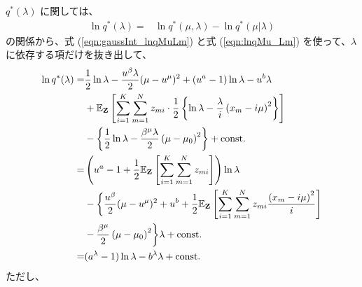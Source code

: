$q^*(\lambda)$ に関しては、
\begin{align}
  \ln q^*(\lambda)  =&  \ln q^*(\mu, \lambda) - \ln q^*(\mu | \lambda)
\end{align}
の関係から、式 (\ref{eqn:gaussInt_lnqMuLm}) と式 (\ref{eqn:lnqMu_Lm}) を使って、$\lambda$ に依存する項だけを抜き出して、
\begin{align}
  \ln q^*(\lambda)  =&  \frac{1}{2} \ln \lambda - \frac{u^\beta \lambda}{2} (\mu - u^\mu)^2 + (u^a - 1) \ln \lambda - u^b \lambda  \notag  \\
  &  + \mathbb{E}_{{\bf Z}}\left[ \sum_{i=1}^K \sum_{m=1}^N z_{mi} \cdot \frac{1}{2} \left\{ \ln \lambda - \frac{\lambda}{i} \left( {x_m} - i \mu \right)^2 \right\} \right]  \notag  \\  
  &  - \left\{  \frac{1}{2} \ln \lambda - \frac{\beta^\mu \lambda}{2} \left( \mu - \mu_{0} \right)^2  \right\}
    + {\rm const.}  \\
%
    =&  \left( u^a - 1 + \frac{1}{2} \mathbb{E}_{\bf Z}\left[ \sum_{i=1}^K \sum_{m=1}^N z_{mi} \right] \right) \ln \lambda  \notag \\ 
    &  - \biggl\{ \frac{u^\beta}{2} (\mu - u^\mu)^2 + u^b + \frac{1}{2} \mathbb{E}_{{\bf Z}}\left[ \sum_{i=1}^K \sum_{m=1}^N z_{mi} \frac{\left( x_m - i \mu \right)^2}{i} \right]  \notag  \\  
    &  - \frac{\beta^\mu}{2} \left( \mu - \mu_{0} \right)^2 \biggr\} \lambda
    + {\rm const.}  \\
%
    =&  (a^\lambda - 1) \ln \lambda - b^\lambda \lambda + {\rm const.}
\end{align}
ただし、
